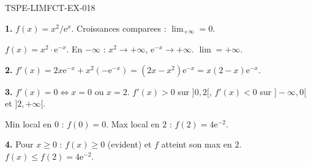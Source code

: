 \begin{corrige}{TSPE-LIMFCT-EX-018}

\textbf{1.} $f(x) = x^2/\mathrm{e}^x$. Croissances comparees : $\lim_{+\infty} = \boxed{0}$.

$f(x) = x^2 \cdot \mathrm{e}^{-x}$. En $-\infty$ : $x^2 \to +\infty$, $\mathrm{e}^{-x} \to +\infty$. $\boxed{\lim = +\infty}$.

\textbf{2.} $f'(x) = 2x\mathrm{e}^{-x} + x^2(-\mathrm{e}^{-x}) = (2x - x^2)\mathrm{e}^{-x} = x(2-x)\mathrm{e}^{-x}$.

\textbf{3.} $f'(x) = 0 \iff x = 0$ ou $x = 2$. $f'(x) > 0$ sur $]0, 2[$, $f'(x) < 0$ sur $]-\infty, 0[$ et $]2, +\infty[$.

Min local en $0$ : $f(0) = 0$. Max local en $2$ : $f(2) = 4\mathrm{e}^{-2}$.

\textbf{4.} Pour $x \geq 0$ : $f(x) \geq 0$ (evident) et $f$ atteint son max en $2$. $f(x) \leq f(2) = 4\mathrm{e}^{-2}$.

\end{corrige}
